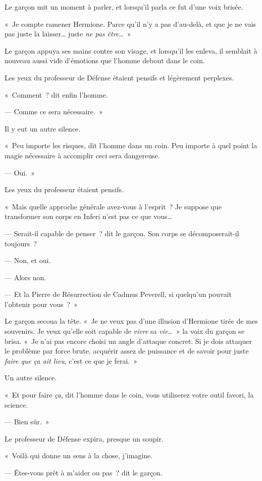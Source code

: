 Le garçon mit un moment à parler, et lorsqu'il parla ce fut d'une voix brisée.

«~Je compte ramener Hermione. Parce qu'il n'y a pas d'au-delà, et que je ne vais pas juste la laisser… juste \emph{ne pas être}…~»

Le garçon appuya ses mains contre son visage, et lorsqu'il les enleva, il semblait à nouveau aussi vide d'émotions que l'homme debout dans le coin.

Les yeux du professeur de Défense étaient pensifs et légèrement perplexes.

«~Comment~? dit enfin l'homme.

--- Comme ce sera nécessaire.~»

Il y eut un autre silence.

«~Peu importe les risques, dit l'homme dans un coin. Peu importe à quel point la magie nécessaire à accomplir ceci sera dangereuse.

--- Oui.~»

Les yeux du professeur étaient pensifs.

«~Mais quelle approche générale avez-vous à l'esprit~? Je suppose que transformer son corps en Inferi n'est pas ce que vous…

--- Serait-il capable de penser~? dit le garçon. Son corps se décomposerait-il toujours~?

--- Non, et oui.

--- Alors non.

--- Et la Pierre de Résurrection de Cadmus Peverell, si quelqu'un pouvait l'obtenir pour vous~?~»

Le garçon secoua la tête. «~Je ne veux pas d'une illusion d'Hermione tirée de mes souvenirs. Je veux qu'elle soit capable de \emph{vivre} sa \emph{vie}…~» la voix du garçon se brisa. «~Je n'ai pas encore choisi un angle d'attaque concret. Si je dois attaquer le problème par force brute, acquérir assez de puissance et de savoir pour juste \emph{faire que ça ait lieu}, c'est ce que je ferai.~»

Un autre silence.

«~Et pour faire \emph{ça}, dit l'homme dans le coin, vous utiliserez votre outil favori, la science.

--- Bien sûr.~»

Le professeur de Défense expira, presque un soupir.

«~Voilà qui donne un sens à la chose, j'imagine.

--- Êtes-vous prêt à m'aider ou pas~? dit le garçon.


